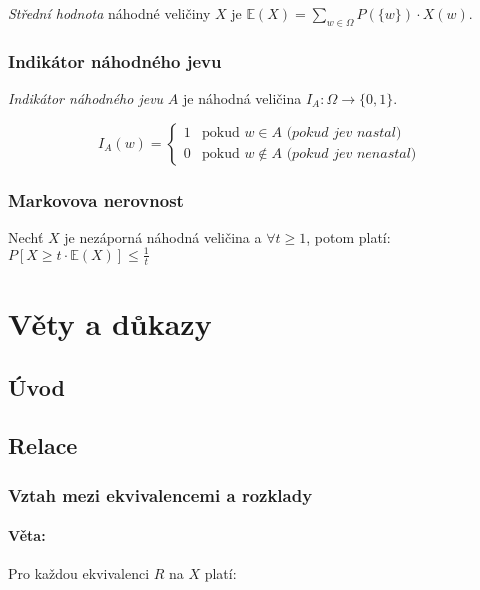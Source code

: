 \documentclass[10pt,a4paper]{article}
\newcommand{\E}{{\mathbb{E}}}
\begin{document}
\textit{Střední hodnota} náhodné veličiny $X$ je $\mathbb{E}(X) = \displaystyle \sum_{w\in \Omega} P(\{w\})\cdot X(w)$.

\subsubsection{Indikátor náhodného jevu}

\textit{Indikátor náhodného jevu} $A$ je náhodná veličina $I_A: \Omega \to \{0, 1\}$.

\[
    I_A(w) = 
    \begin{cases}
        1 & \text{pokud } w\in A \textit{ (pokud jev nastal)}\\
        0 & \text{pokud } w\notin A \textit{ (pokud jev nenastal)}
    \end{cases}
\]

\subsubsection{Markovova nerovnost}

Nechť $X$ je nezáporná náhodná veličina a $\forall t \geq 1$, potom platí:
\(P[X \geq t \cdot \E (X)] \leq \frac1t\)


\newpage
\section{Věty a důkazy}
\subsection{Úvod}

\subsection{Relace}

\subsubsection{Vztah mezi ekvivalencemi a rozklady}

\paragraph*{Věta: } Pro každou ekvivalenci $R$ na $X$ platí:
\end{document}
